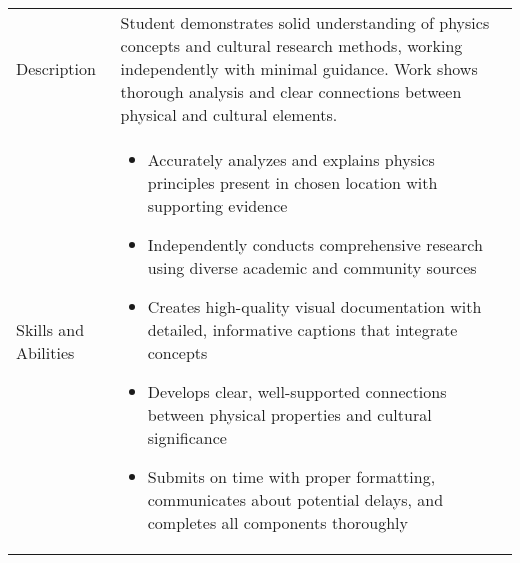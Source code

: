 \documentclass[12pt]{article}
\begin{document}
\begin{table}[t]
\renewcommand{\arraystretch}{1.5}
\begin{tabular}{>{\raggedright\arraybackslash}p{2cm}|>{\raggedright\arraybackslash}p{14cm}}
\toprule
\multicolumn{2}{l}{\textbf{Proficient}} \\
\midrule
Description & Student demonstrates solid understanding of physics concepts and cultural research methods, working independently with minimal guidance. Work shows thorough analysis and clear connections between physical and cultural elements. \\
\midrule
Skills and Abilities & 
\begin{itemize}
    \item Accurately analyzes and explains physics principles present in chosen location with supporting evidence
    \item Independently conducts comprehensive research using diverse academic and community sources
    \item Creates high-quality visual documentation with detailed, informative captions that integrate concepts
    \item Develops clear, well-supported connections between physical properties and cultural significance
    \item Submits on time with proper formatting, communicates about potential delays, and completes all components thoroughly
\end{itemize} \\
\bottomrule
\end{tabular}
\end{table}
\end{document}
